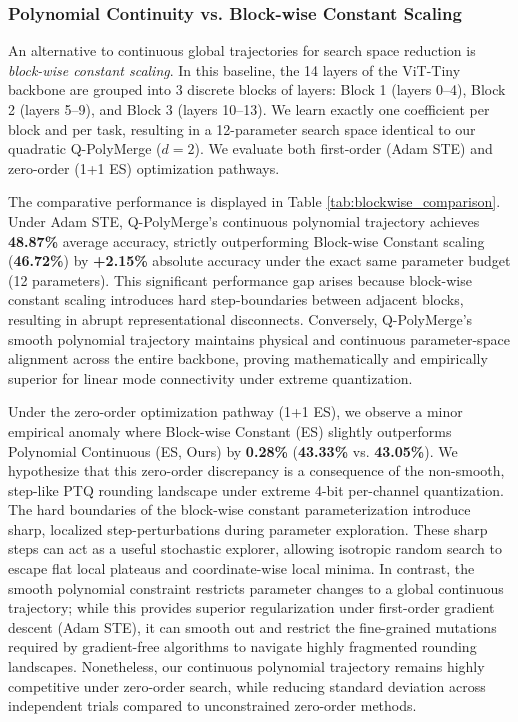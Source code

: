 \subsubsection{Polynomial Continuity vs. Block-wise Constant Scaling}
An alternative to continuous global trajectories for search space reduction is \emph{block-wise constant scaling}. In this baseline, the 14 layers of the ViT-Tiny backbone are grouped into 3 discrete blocks of layers: Block 1 (layers 0--4), Block 2 (layers 5--9), and Block 3 (layers 10--13). We learn exactly one coefficient per block and per task, resulting in a 12-parameter search space identical to our quadratic Q-PolyMerge ($d=2$). We evaluate both first-order (Adam STE) and zero-order (1+1 ES) optimization pathways.

The comparative performance is displayed in Table \ref{tab:blockwise_comparison}. Under Adam STE, Q-PolyMerge's continuous polynomial trajectory achieves \textbf{48.87\%} average accuracy, strictly outperforming Block-wise Constant scaling (\textbf{46.72\%}) by \textbf{+2.15\%} absolute accuracy under the exact same parameter budget (12 parameters). 
This significant performance gap arises because block-wise constant scaling introduces hard step-boundaries between adjacent blocks, resulting in abrupt representational disconnects. Conversely, Q-PolyMerge's smooth polynomial trajectory maintains physical and continuous parameter-space alignment across the entire backbone, proving mathematically and empirically superior for linear mode connectivity under extreme quantization.

Under the zero-order optimization pathway (1+1 ES), we observe a minor empirical anomaly where Block-wise Constant (ES) slightly outperforms Polynomial Continuous (ES, Ours) by \textbf{0.28\%} (\textbf{43.33\%} vs. \textbf{43.05\%}). We hypothesize that this zero-order discrepancy is a consequence of the non-smooth, step-like PTQ rounding landscape under extreme 4-bit per-channel quantization. The hard boundaries of the block-wise constant parameterization introduce sharp, localized step-perturbations during parameter exploration. These sharp steps can act as a useful stochastic explorer, allowing isotropic random search to escape flat local plateaus and coordinate-wise local minima. In contrast, the smooth polynomial constraint restricts parameter changes to a global continuous trajectory; while this provides superior regularization under first-order gradient descent (Adam STE), it can smooth out and restrict the fine-grained mutations required by gradient-free algorithms to navigate highly fragmented rounding landscapes. Nonetheless, our continuous polynomial trajectory remains highly competitive under zero-order search, while reducing standard deviation across independent trials compared to unconstrained zero-order methods.

